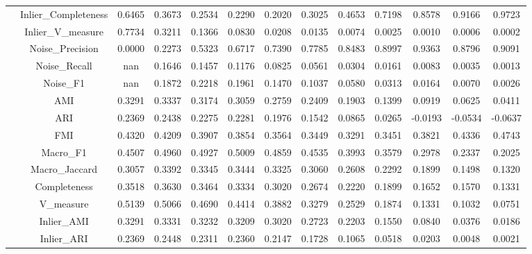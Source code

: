 \begin{table}[ht!]
\begin{tabular*}{\linewidth}{@{} lc c c c c c c c c c c c @{}}
 & Inlier_Completeness  & 0.6465 & 0.3673 & 0.2534 & 0.2290 & 0.2020 & 0.3025 & 0.4653 & 0.7198 & 0.8578 & 0.9166 & 0.9723 \\

 & Inlier_V_measure  & 0.7734 & 0.3211 & 0.1366 & 0.0830 & 0.0208 & 0.0135 & 0.0074 & 0.0025 & 0.0010 & 0.0006 & 0.0002 \\

 & Noise_Precision  & 0.0000 & 0.2273 & 0.5323 & 0.6717 & 0.7390 & 0.7785 & 0.8483 & 0.8997 & 0.9363 & 0.8796 & 0.9091 \\

 & Noise_Recall  & nan & 0.1646 & 0.1457 & 0.1176 & 0.0825 & 0.0561 & 0.0304 & 0.0161 & 0.0083 & 0.0035 & 0.0013 \\

 & Noise_F1  & nan & 0.1872 & 0.2218 & 0.1961 & 0.1470 & 0.1037 & 0.0580 & 0.0313 & 0.0164 & 0.0070 & 0.0026 \\
\addlinespace
\multirow{17}{*}{CLIQUE}
 & AMI  & 0.3291 & 0.3337 & 0.3174 & 0.3059 & 0.2759 & 0.2409 & 0.1903 & 0.1399 & 0.0919 & 0.0625 & 0.0411 \\

 & ARI  & 0.2369 & 0.2438 & 0.2275 & 0.2281 & 0.1976 & 0.1542 & 0.0865 & 0.0265 & -0.0193 & -0.0534 & -0.0637 \\

 & FMI  & 0.4320 & 0.4209 & 0.3907 & 0.3854 & 0.3564 & 0.3449 & 0.3291 & 0.3451 & 0.3821 & 0.4336 & 0.4743 \\

 & Macro_F1  & 0.4507 & 0.4960 & 0.4927 & 0.5009 & 0.4859 & 0.4535 & 0.3993 & 0.3579 & 0.2978 & 0.2337 & 0.2025 \\

 & Macro_Jaccard  & 0.3057 & 0.3392 & 0.3345 & 0.3444 & 0.3325 & 0.3060 & 0.2608 & 0.2292 & 0.1899 & 0.1498 & 0.1320 \\

 & Completeness  & 0.3518 & 0.3630 & 0.3464 & 0.3334 & 0.3020 & 0.2674 & 0.2220 & 0.1899 & 0.1652 & 0.1570 & 0.1331 \\

 & V_measure  & 0.5139 & 0.5066 & 0.4690 & 0.4414 & 0.3882 & 0.3279 & 0.2529 & 0.1874 & 0.1331 & 0.1032 & 0.0751 \\

 & Inlier_AMI  & 0.3291 & 0.3331 & 0.3232 & 0.3209 & 0.3020 & 0.2723 & 0.2203 & 0.1550 & 0.0840 & 0.0376 & 0.0186 \\

 & Inlier_ARI  & 0.2369 & 0.2448 & 0.2311 & 0.2360 & 0.2147 & 0.1728 & 0.1065 & 0.0518 & 0.0203 & 0.0048 & 0.0021 \\


\end{tabular*}
\end{table}
